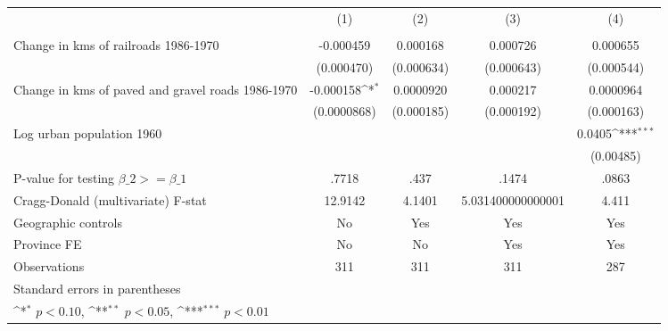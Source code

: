 {
\def\sym#1{\ifmmode^{#1}\else\(^{#1}\)\fi}
\begin{tabular}{l*{4}{c}}
\hline\hline
                &\multicolumn{1}{c}{(1)}&\multicolumn{1}{c}{(2)}&\multicolumn{1}{c}{(3)}&\multicolumn{1}{c}{(4)}\\
                &\multicolumn{1}{c}{}&\multicolumn{1}{c}{}&\multicolumn{1}{c}{}&\multicolumn{1}{c}{}\\
\hline
Change in kms of railroads 1986-1970&-0.000459         & 0.000168         & 0.000726         & 0.000655         \\
                &(0.000470)         &(0.000634)         &(0.000643)         &(0.000544)         \\
[1em]
Change in kms of paved and gravel roads 1986-1970&-0.000158\sym{*}  &0.0000920         & 0.000217         &0.0000964         \\
                &(0.0000868)         &(0.000185)         &(0.000192)         &(0.000163)         \\
[1em]
Log urban population 1960&                  &                  &                  &   0.0405\sym{***}\\
                &                  &                  &                  &(0.00485)         \\
\hline
P-value for testing $\beta\_{2} >= \beta\_{1}$&    .7718         &     .437         &    .1474         &    .0863         \\
Cragg-Donald (multivariate) F-stat&  12.9142         &   4.1401         &5.031400000000001         &    4.411         \\
Geographic controls&       No         &      Yes         &      Yes         &      Yes         \\
Province FE     &       No         &       No         &      Yes         &      Yes         \\
Observations    &      311         &      311         &      311         &      287         \\
\hline\hline
\multicolumn{5}{l}{\footnotesize Standard errors in parentheses}\\
\multicolumn{5}{l}{\footnotesize \sym{*} \(p<0.10\), \sym{**} \(p<0.05\), \sym{***} \(p<0.01\)}\\
\end{tabular}
}
